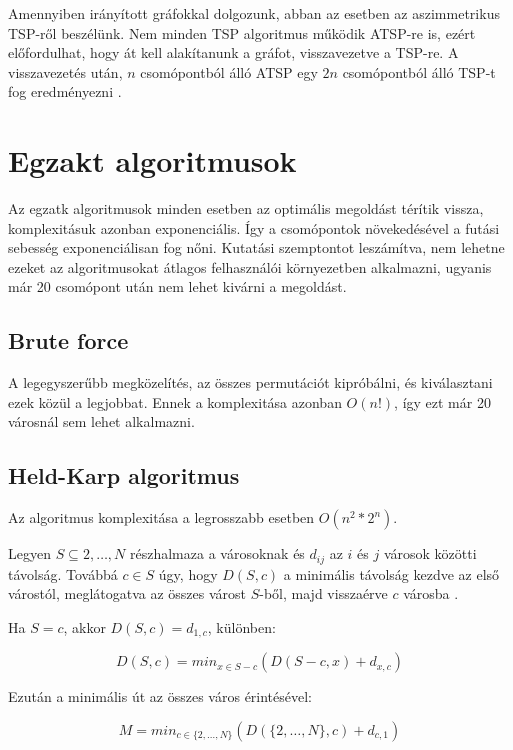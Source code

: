 Amennyiben irányított gráfokkal dolgozunk, abban az esetben az aszimmetrikus TSP-ről beszélünk. Nem minden TSP algoritmus működik ATSP-re is, ezért előfordulhat, hogy át kell alakítanunk a gráfot, visszavezetve a TSP-re. A visszavezetés után, \(n\) csomópontból álló ATSP egy \(2n\) csomópontból álló TSP-t fog eredményezni \cite{13}.

\section{Egzakt algoritmusok}\label{sec:ALAP:adatelem}

Az egzatk algoritmusok minden esetben az optimális megoldást térítik vissza, komplexitásuk azonban exponenciális. Így a csomópontok növekedésével a futási sebesség exponenciálisan fog nőni. Kutatási szemptontot leszámítva, nem lehetne ezeket az algoritmusokat átlagos felhasználói környezetben alkalmazni, ugyanis már 20 csomópont után nem lehet kivárni a megoldást. 

\subsection{Brute force}

A legegyszerűbb megközelítés, az összes permutációt kipróbálni, és kiválasztani ezek közül a legjobbat. Ennek a komplexitása azonban \(O(n!)\), így ezt már 20 városnál sem lehet alkalmazni.


\subsection{Held-Karp algoritmus}

Az algoritmus komplexitása a legrosszabb esetben \(O(n^2*2^n)\).

Legyen \(S \subseteq {2, \dots, N}\) részhalmaza a városoknak és \(d_{ij}\) az \(i\) és \(j\) városok közötti távolság. Továbbá \(c \in S\) úgy, hogy \(D(S,c)\) a minimális távolság kezdve az első várostól, meglátogatva az összes várost \(S\)-ből, majd visszaérve \(c\) városba \cite{9}.

Ha \(S = {c}\), akkor \(D(S,c) = d_{1,c}\), különben:

\begin{equation}
D(S,c) = min_{x \in S-c}(D(S - c,x)+d_{x,c})
\end{equation}

Ezután a minimális út az összes város érintésével:

\begin{equation}
M = min_{c \in \{2, \dots, N\}}(D(\{2, \dots, N\}, c)+d_{c, 1})
\end{equation}

